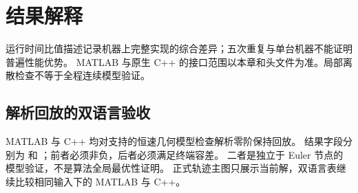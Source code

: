 \section{结果解释}
运行时间比值描述记录机器上完整实现的综合差异；五次重复与单台机器不能证明普遍性能优势。
MATLAB 与原生 C++ 的接口范围以本章和头文件为准。局部离散检查不等于全程连续模型验证。

\subsection{解析回放的双语言验收}
MATLAB 与 C++ 均对支持的恒速几何模型检查解析零阶保持回放。
结果字段分别为  和
；前者必须非负，后者必须满足终端容差。
二者是独立于 Euler 节点的模型验证，不是算法全局最优性证明。
正式轨迹主图只展示当前解，双语言表继续比较相同输入下的 MATLAB 与 C++。

